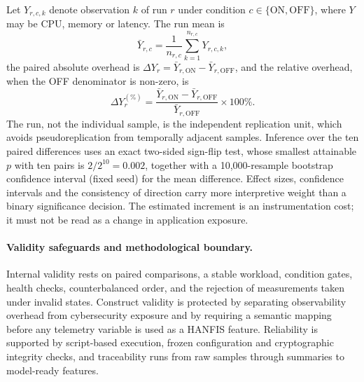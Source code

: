 \documentclass[pdflatex,sn-basic]{sn-jnl}
\theoremstyle{thmstyleone}%
\theoremstyle{thmstyletwo}%
\theoremstyle{thmstylethree}%
\begin{document}
Let $Y_{r,c,k}$ denote observation $k$ of run $r$ under condition $c\in\{\mathrm{ON},\mathrm{OFF}\}$, where $Y$ may be CPU, memory or latency. The run mean is
\begin{equation}
 \bar{Y}_{r,c}=\frac{1}{n_{r,c}}\sum_{k=1}^{n_{r,c}}Y_{r,c,k},
\end{equation}
the paired absolute overhead is $\Delta Y_r=\bar{Y}_{r,\mathrm{ON}}-\bar{Y}_{r,\mathrm{OFF}}$, and the relative overhead, when the OFF denominator is non-zero, is
\begin{equation}
 \Delta Y^{(\%)}_r=\frac{\bar{Y}_{r,\mathrm{ON}}-\bar{Y}_{r,\mathrm{OFF}}}{\bar{Y}_{r,\mathrm{OFF}}}\times100\%.
\end{equation}
The run, not the individual sample, is the independent replication unit, which avoids pseudoreplication from temporally adjacent samples. Inference over the ten paired differences uses an exact two-sided sign-flip test, whose smallest attainable $p$ with ten pairs is $2/2^{10}=0.002$, together with a 10{,}000-resample bootstrap~\citep{efron1979bootstrap} confidence interval (fixed seed) for the mean difference. Effect sizes, confidence intervals and the consistency of direction carry more interpretive weight than a binary significance decision. The estimated increment is an instrumentation cost; it must not be read as a change in application exposure.

\paragraph{Validity safeguards and methodological boundary.}
Internal validity rests on paired comparisons, a stable workload, condition gates, health checks, counterbalanced order, and the rejection of measurements taken under invalid states. Construct validity is protected by separating observability overhead from cybersecurity exposure and by requiring a semantic mapping before any telemetry variable is used as a HANFIS feature. Reliability is supported by script-based execution, frozen configuration and cryptographic integrity checks, and traceability runs from raw samples through summaries to model-ready features.
\end{document}
